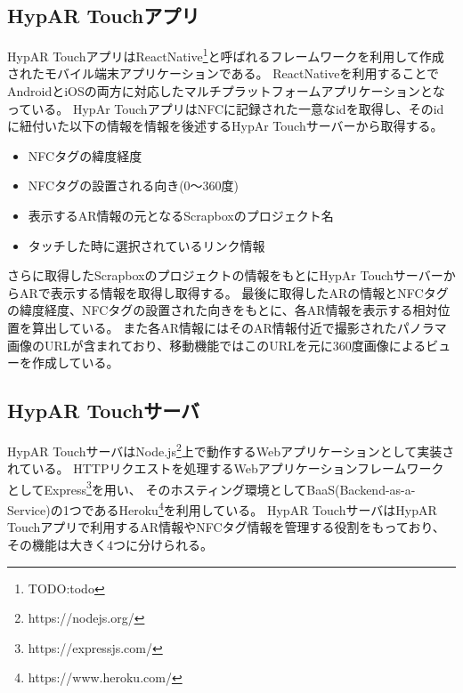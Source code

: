 \subsection{HypAR Touchアプリ}
HypAR TouchアプリはReactNative\footnote{\textsf{TODO:todo}}と呼ばれるフレームワークを利用して作成されたモバイル端末アプリケーションである。
ReactNativeを利用することでAndroidとiOSの両方に対応したマルチプラットフォームアプリケーションとなっている。
HypAr TouchアプリはNFCに記録された一意なidを取得し、そのidに紐付いた以下の情報を情報を後述するHypAr Touchサーバーから取得する。
\begin{itemize}
  \item NFCタグの緯度経度
  \item NFCタグの設置される向き(0〜360度)
  \item 表示するAR情報の元となるScrapboxのプロジェクト名
  \item タッチした時に選択されているリンク情報
\end{itemize}
さらに取得したScrapboxのプロジェクトの情報をもとにHypAr TouchサーバーからARで表示する情報を取得し取得する。
最後に取得したARの情報とNFCタグの緯度経度、NFCタグの設置された向きをもとに、各AR情報を表示する相対位置を算出している。
また各AR情報にはそのAR情報付近で撮影されたパノラマ画像のURLが含まれており、移動機能ではこのURLを元に360度画像によるビューを作成している。

\subsection{HypAR Touchサーバ}
HypAR TouchサーバはNode.js\footnote{\textsf{https://nodejs.org/}}上で動作するWebアプリケーションとして実装されている。
HTTPリクエストを処理するWebアプリケーションフレームワークとしてExpress\footnote{\textsf{https://expressjs.com/}}を用い、
そのホスティング環境としてBaaS(Backend-as-a-Service)の1つであるHeroku\footnote{\textsf{https://www.heroku.com/}}を利用している。
HypAR TouchサーバはHypAR Touchアプリで利用するAR情報やNFCタグ情報を管理する役割をもっており、その機能は大きく4つに分けられる。

